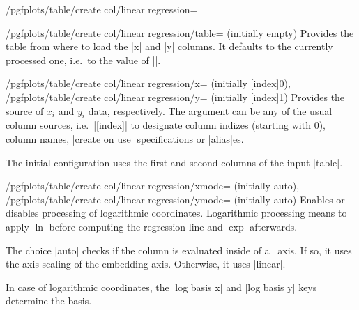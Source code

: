 \begin{stylekey}{/pgfplots/table/create col/linear regression=}
	\begin{key}{%
		/pgfplots/table/create col/linear regression/table= (initially empty)}
		Provides the table from where to load the |x| and |y| columns. It defaults to the currently processed one, i.e.\ to the value of |\pgfplotstablename|.
	\end{key}
	\begin{keylist}{%
		/pgfplots/table/create col/linear regression/x= (initially [index]0),
		/pgfplots/table/create col/linear regression/y= (initially [index]1)}
		Provides the source of $x_i$ and $y_i$ data, respectively. The argument  can be any of the usual column sources, i.e.\ |[index]| to designate column indizes (starting with $0$), column names, |create on use| specifications or |alias|es.

		The initial configuration uses the first and second columns of the input |table|.
	\end{keylist}

	\begin{keylist}{%
		/pgfplots/table/create col/linear regression/xmode= (initially auto),
		/pgfplots/table/create col/linear regression/ymode= (initially auto)}
		Enables or disables processing of logarithmic coordinates. Logarithmic processing means to apply $\ln$ before computing the regression line and $\exp$ afterwards.

		The choice |auto| checks if the column is evaluated inside of a \PGFPlots\ axis. If so, it uses the axis scaling of the embedding axis. Otherwise, it uses |linear|.

		In case of logarithmic coordinates, the |log basis x| and |log basis y| keys determine the basis.

\begin{codeexample}[]
\end{codeexample}
\end{keylist}
\end{stylekey}
